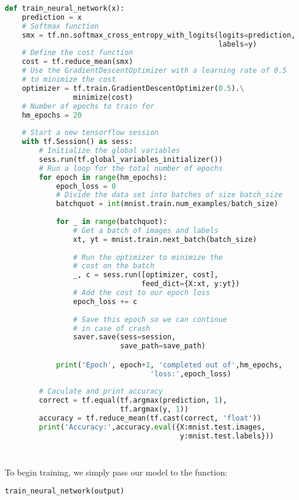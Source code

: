 \documentclass[Proceedings]{ascelike}
\begin{document}
\begin{lstlisting}[language=Python]
def train_neural_network(x):
    prediction = x
    # Softmax function
    smx = tf.nn.softmax_cross_entropy_with_logits(logits=prediction,
                                                  labels=y)
    # Define the cost function
    cost = tf.reduce_mean(smx)
    # Use the GradientDescentOptimizer with a learning rate of 0.5 
    # to minimize the cost
    optimizer = tf.train.GradientDescentOptimizer(0.5).\
                minimize(cost)
    # Number of epochs to train for
    hm_epochs = 20
    
    # Start a new tensorflow session
    with tf.Session() as sess:
        # Initialize the global variables
        sess.run(tf.global_variables_initializer())
        # Run a loop for the total number of epochs
        for epoch in range(hm_epochs):
            epoch_loss = 0
            # Divide the data set into batches of size batch_size
            batchquot = int(mnist.train.num_examples/batch_size)
            
            for _ in range(batchquot):
                # Get a batch of images and labels
                xt, yt = mnist.train.next_batch(batch_size)
                
                # Run the optimizer to minimize the 
                # cost on the batch
                _, c = sess.run([optimizer, cost], 
                                feed_dict={X:xt, y:yt})
                # Add the cost to our epoch loss
                epoch_loss += c
                
                # Save this epoch so we can continue
                # in case of crash
                saver.save(sess=session,
                           save_path=save_path)

            print('Epoch', epoch+1, 'completed out of',hm_epochs,
                                  'loss:',epoch_loss)
        
        # Caculate and print accuracy
        correct = tf.equal(tf.argmax(prediction, 1), 
                           tf.argmax(y, 1))
        accuracy = tf.reduce_mean(tf.cast(correct, 'float'))
        print('Accuracy:',accuracy.eval({X:mnist.test.images, 
                                         y:mnist.test.labels}))
        
        
\end{lstlisting}

To begin training, we simply pass our model to the function:

\begin{lstlisting}[language=Python]
train_neural_network(output)
\end{lstlisting}
\end{document}
